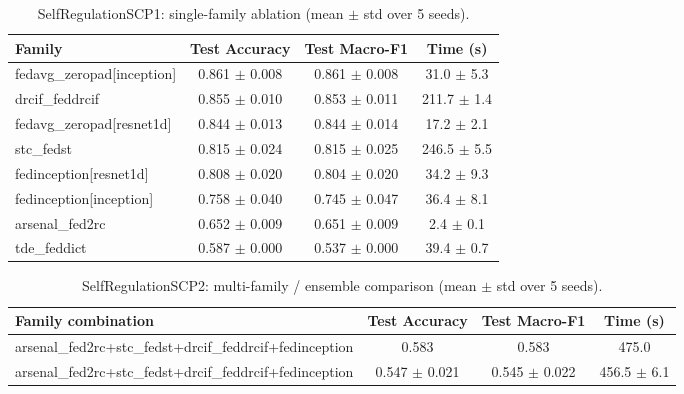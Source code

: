 \begin{table}[t]
\centering
\caption{SelfRegulationSCP1: single-family ablation (mean $\pm$ std over 5 seeds).}
\label{tab:results_selfregulationscp1_ablation}
\begin{tabular}{lccc}
\toprule
Family & Test Accuracy & Test Macro-F1 & Time (s) \\
\midrule
fedavg\_zeropad[inception] & 0.861 $\pm$ 0.008 & 0.861 $\pm$ 0.008 & 31.0 $\pm$ 5.3 \\
drcif\_feddrcif & 0.855 $\pm$ 0.010 & 0.853 $\pm$ 0.011 & 211.7 $\pm$ 1.4 \\
fedavg\_zeropad[resnet1d] & 0.844 $\pm$ 0.013 & 0.844 $\pm$ 0.014 & 17.2 $\pm$ 2.1 \\
stc\_fedst & 0.815 $\pm$ 0.024 & 0.815 $\pm$ 0.025 & 246.5 $\pm$ 5.5 \\
fedinception[resnet1d] & 0.808 $\pm$ 0.020 & 0.804 $\pm$ 0.020 & 34.2 $\pm$ 9.3 \\
fedinception[inception] & 0.758 $\pm$ 0.040 & 0.745 $\pm$ 0.047 & 36.4 $\pm$ 8.1 \\
arsenal\_fed2rc & 0.652 $\pm$ 0.009 & 0.651 $\pm$ 0.009 & 2.4 $\pm$ 0.1 \\
tde\_feddict & 0.587 $\pm$ 0.000 & 0.537 $\pm$ 0.000 & 39.4 $\pm$ 0.7 \\
\bottomrule
\end{tabular}
\end{table}

\begin{table}[t]
\centering
\caption{SelfRegulationSCP2: multi-family / ensemble comparison (mean $\pm$ std over 5 seeds).}
\label{tab:results_selfregulationscp2_ensemble}
\begin{tabular}{lccc}
\toprule
Family combination & Test Accuracy & Test Macro-F1 & Time (s) \\
\midrule
arsenal\_fed2rc+stc\_fedst+drcif\_feddrcif+fedinception & 0.583 & 0.583 & 475.0 \\
arsenal\_fed2rc+stc\_fedst+drcif\_feddrcif+fedinception & 0.547 $\pm$ 0.021 & 0.545 $\pm$ 0.022 & 456.5 $\pm$ 6.1 \\
\bottomrule
\end{tabular}
\end{table}

